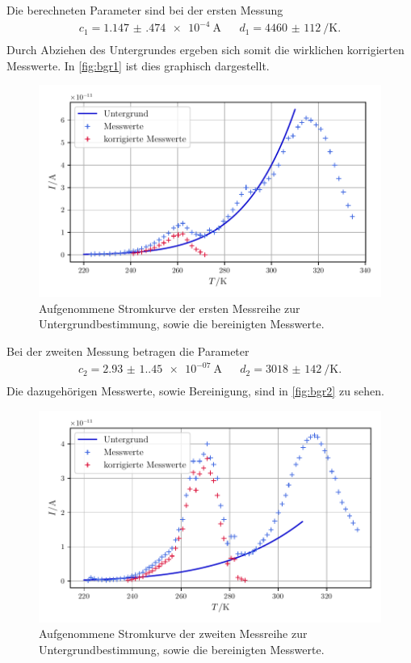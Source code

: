 Die berechneten Parameter sind bei der ersten Messung
\begin{align}
    c_1 = \qty{1.147(474)e-4}{\ampere} && d_1 = \qty{4460(112)}{\per\kelvin}.\\
\end{align}
Durch Abziehen des Untergrundes ergeben sich somit die wirklichen korrigierten Messwerte.
In \autoref{fig:bgr1} ist dies graphisch dargestellt.
\begin{figure}
    \centering
    \includegraphics[width=0.8\linewidth]{scripts/build/plot1_bgr.pdf}
    \caption{Aufgenommene Stromkurve der ersten Messreihe zur Untergrundbestimmung, sowie die bereinigten Messwerte.}%
    \label{fig:bgr1}
\end{figure}

Bei der zweiten Messung betragen die Parameter
\begin{align}
    c_2 = \qty{2.93(1.45)e-07}{\ampere} && d_2 = \qty{3018(142)}{\per\kelvin}.\\
\end{align}
Die dazugehörigen Messwerte, sowie Bereinigung, sind in \autoref{fig:bgr2} zu sehen.
\begin{figure}
    \centering
    \includegraphics[width=0.8\linewidth]{scripts/build/plot2_bgr.pdf}
    \caption{Aufgenommene Stromkurve der zweiten Messreihe zur Untergrundbestimmung, sowie die bereinigten Messwerte.}%
    \label{fig:bgr2}
\end{figure}
\newpage
